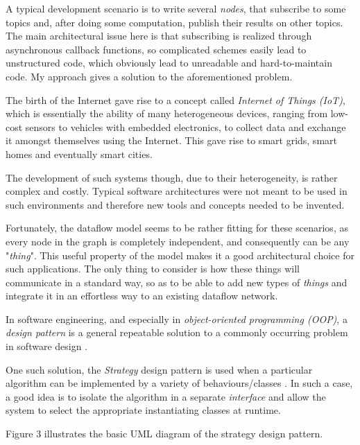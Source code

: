 \documentclass{dithesis}
\begin{document}
A typical development scenario is to write several \textit{nodes}, that subscribe to some topics and, after doing some computation, publish their results on other topics. The main architectural issue here is that subscribing is realized through asynchronous callback functions, so complicated schemes easily lead to unstructured code, which obviously lead to unreadable and hard-to-maintain code. My approach gives a solution to the aforementioned problem.
 

The birth of the Internet gave rise to a concept called \textit{Internet of Things (IoT)}, which is essentially the ability of many heterogeneous devices, ranging from low-cost sensors to vehicles with embedded electronics, to collect data and exchange it amongst themselves using the Internet. This gave rise to smart grids, smart homes and eventually smart cities. 

The development of such systems though, due to their heterogeneity, is rather complex and costly. Typical software architectures were not meant to be used in such environments and therefore new tools and concepts needed to be invented. 

Fortunately, the dataflow model seems to be rather fitting for these scenarios, as every node in the graph is completely independent, and consequently can be any "\textit{thing}". This useful property of the model makes it a good architectural choice for such applications. The only thing to consider is how these things will communicate in a standard way, so as to be able to add new types of \textit{things} and integrate it in an effortless way to an existing dataflow network.


In software engineering, and especially in \textit{object-oriented programming (OOP)}, a \textit{design pattern} is a general repeatable solution to a commonly occurring problem in software design \cite{design}.

One such solution, the \textit{Strategy} design pattern is used when a particular algorithm can be implemented by a variety of behaviours/classes \cite{design}. In such a case, a good idea is to isolate the algorithm in a separate \textit{interface} and allow the system to select the appropriate instantiating classes at runtime.

Figure 3 illustrates the basic UML diagram of the strategy design pattern.
\end{document}
